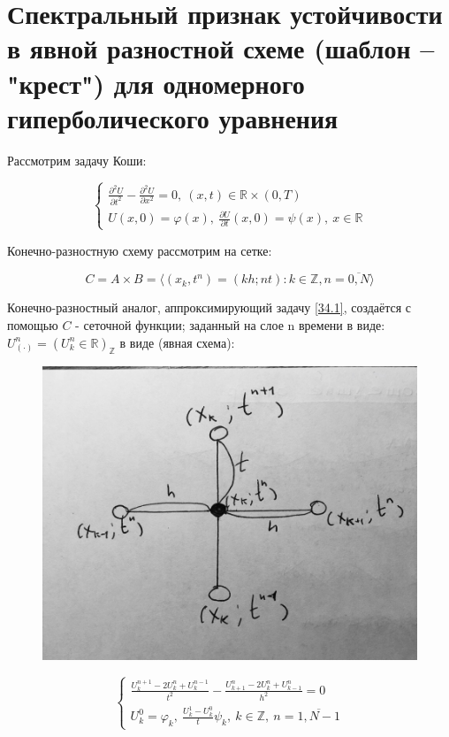 \documentclass[__main__.tex]{subfiles}
\begin{document}
\section{Спектральный признак устойчивости в явной разностной схеме (шаблон -- "крест") для одномерного гиперболического уравнения}

Рассмотрим задачу Коши:

\begin{equation} \label{34.1}
\begin{cases}
\frac{\partial^2 U}{\partial t^2} - \frac{\partial^2 U}{\partial x^2} = 0, \ \left(x,t\right) \in \mathbb{R} \times \left(0,T\right) \\
U \left(x,0\right) = \varphi \left(x\right), \ \frac{\partial U}{\partial t} \left(x,0\right) = \psi \left(x\right), \ x\in \mathbb{R}
\end{cases}
\end{equation}


Конечно-разностную схему рассмотрим на сетке:

$$
C = A \times B = \langle \left(x_k, t^n\right) = \left(k h; n t\right): k \in \mathbb{Z}, n = \overline{0,N} \rangle
$$

Конечно-разностный аналог, аппроксимирующий задачу \ref{34.1}, создаётся с помощью $C$ - сеточной функции; заданный на слое n времени в виде: $U^n_{\left(\cdot\right)} = \left(U^n_k \in\mathbb{R}\right)_{\mathbb{Z}}$ в виде (явная схема):

\begin{figure}[ht]
	\centering
	\includegraphics[width=0.4\linewidth]{img/img_34-1}
	\caption{}
	\label{img_34.1}
\end{figure}

\begin{equation}\label{34.2}
\begin{cases}
\frac{U^{n+1}_k - 2U^n_k+U^{n-1}_k}{t^2} - \frac{U^n_{k+1} -2U^n_k+U^n_{k-1}}{h^2} = 0 \\
U^0_k = \varphi_k, \ \frac{U^1_k - U^0_k}{t} \psi_k, \ k\in\mathbb{Z}, \ n = \overline{1,N-1}
\end{cases}
\end{equation}
\end{document}
